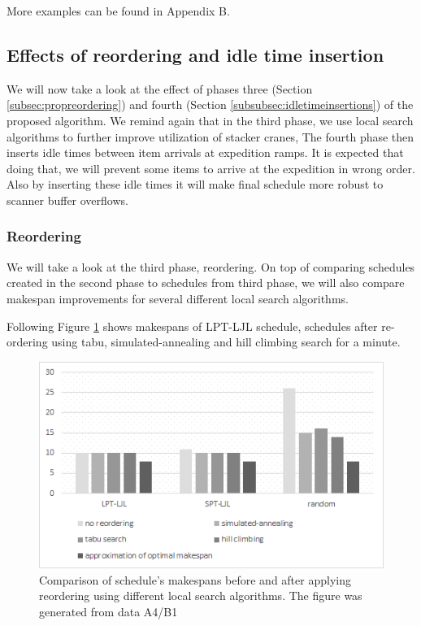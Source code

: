 \documentclass{ctuthesis}
\begin{document}
More examples can be found in Appendix B.

\subsection{Effects of reordering and idle time insertion}

We will now take a look at the effect of phases three (Section \ref{subsec:propreordering}) and fourth (Section \ref{subsubsec:idletimeinsertions}) of the proposed algorithm. We remind again that in the third phase, we use local search algorithms to further improve utilization of stacker cranes, The fourth phase then inserts idle times between item arrivals at expedition ramps. It is expected that doing that, we will prevent some items to arrive at the expedition in wrong order. Also by inserting these idle times it will make final schedule more robust to scanner buffer overflows.

\subsubsection{Reordering}
\label{subsubsec:reordering}
We will take a look at the third phase, reordering. On top of comparing schedules created in the second phase to schedules from third phase, we will also compare makespan improvements for several different local search algorithms.

Following Figure \ref{fig:reor1} shows makespans of LPT-LJL schedule, schedules after re-ordering using tabu, simulated-annealing and hill climbing search for a minute.

\begin{figure}[H]
\includegraphics[width=1\linewidth]{reor1.png}
\caption{Comparison of schedule's makespans before and after applying reordering using different local search algorithms. The figure was generated from data A4/B1}
\label{fig:reor1}
\end{figure}
\end{document}
